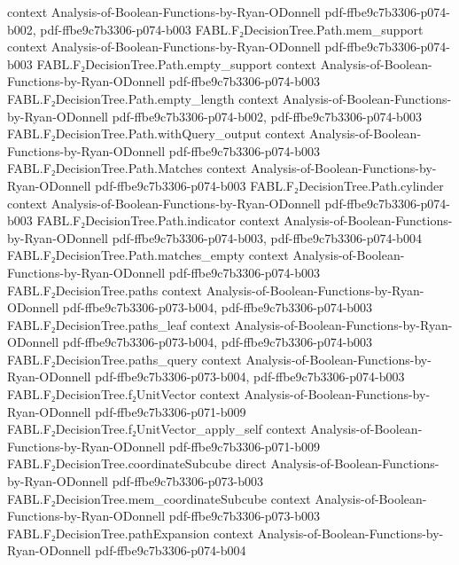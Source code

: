 \begin{theorem}
  {context}
  {Analysis-of-Boolean-Functions-by-Ryan-ODonnell}
  {pdf-ffbe9c7b3306-p074-b002,
    pdf-ffbe9c7b3306-p074-b003}
\proofstep
  {FABL.F₂DecisionTree.Path.mem_support}
  {context}
  {Analysis-of-Boolean-Functions-by-Ryan-ODonnell}
  {pdf-ffbe9c7b3306-p074-b003}
\proofstep
  {FABL.F₂DecisionTree.Path.empty_support}
  {context}
  {Analysis-of-Boolean-Functions-by-Ryan-ODonnell}
  {pdf-ffbe9c7b3306-p074-b003}
\proofstep
  {FABL.F₂DecisionTree.Path.empty_length}
  {context}
  {Analysis-of-Boolean-Functions-by-Ryan-ODonnell}
  {pdf-ffbe9c7b3306-p074-b002,
    pdf-ffbe9c7b3306-p074-b003}
\proofstep
  {FABL.F₂DecisionTree.Path.withQuery_output}
  {context}
  {Analysis-of-Boolean-Functions-by-Ryan-ODonnell}
  {pdf-ffbe9c7b3306-p074-b003}
\proofstep
  {FABL.F₂DecisionTree.Path.Matches}
  {context}
  {Analysis-of-Boolean-Functions-by-Ryan-ODonnell}
  {pdf-ffbe9c7b3306-p074-b003}
\proofstep
  {FABL.F₂DecisionTree.Path.cylinder}
  {context}
  {Analysis-of-Boolean-Functions-by-Ryan-ODonnell}
  {pdf-ffbe9c7b3306-p074-b003}
\proofstep
  {FABL.F₂DecisionTree.Path.indicator}
  {context}
  {Analysis-of-Boolean-Functions-by-Ryan-ODonnell}
  {pdf-ffbe9c7b3306-p074-b003,
    pdf-ffbe9c7b3306-p074-b004}
\proofstep
  {FABL.F₂DecisionTree.Path.matches_empty}
  {context}
  {Analysis-of-Boolean-Functions-by-Ryan-ODonnell}
  {pdf-ffbe9c7b3306-p074-b003}
\proofstep
  {FABL.F₂DecisionTree.paths}
  {context}
  {Analysis-of-Boolean-Functions-by-Ryan-ODonnell}
  {pdf-ffbe9c7b3306-p073-b004,
    pdf-ffbe9c7b3306-p074-b003}
\proofstep
  {FABL.F₂DecisionTree.paths_leaf}
  {context}
  {Analysis-of-Boolean-Functions-by-Ryan-ODonnell}
  {pdf-ffbe9c7b3306-p073-b004,
    pdf-ffbe9c7b3306-p074-b003}
\proofstep
  {FABL.F₂DecisionTree.paths_query}
  {context}
  {Analysis-of-Boolean-Functions-by-Ryan-ODonnell}
  {pdf-ffbe9c7b3306-p073-b004,
    pdf-ffbe9c7b3306-p074-b003}
\proofstep
  {FABL.F₂DecisionTree.f₂UnitVector}
  {context}
  {Analysis-of-Boolean-Functions-by-Ryan-ODonnell}
  {pdf-ffbe9c7b3306-p071-b009}
\proofstep
  {FABL.F₂DecisionTree.f₂UnitVector_apply_self}
  {context}
  {Analysis-of-Boolean-Functions-by-Ryan-ODonnell}
  {pdf-ffbe9c7b3306-p071-b009}
\proofstep
  {FABL.F₂DecisionTree.coordinateSubcube}
  {direct}
  {Analysis-of-Boolean-Functions-by-Ryan-ODonnell}
  {pdf-ffbe9c7b3306-p073-b003}
\proofstep
  {FABL.F₂DecisionTree.mem_coordinateSubcube}
  {context}
  {Analysis-of-Boolean-Functions-by-Ryan-ODonnell}
  {pdf-ffbe9c7b3306-p073-b003}
\proofstep
  {FABL.F₂DecisionTree.pathExpansion}
  {context}
  {Analysis-of-Boolean-Functions-by-Ryan-ODonnell}
  {pdf-ffbe9c7b3306-p074-b004}

\end{theorem}
